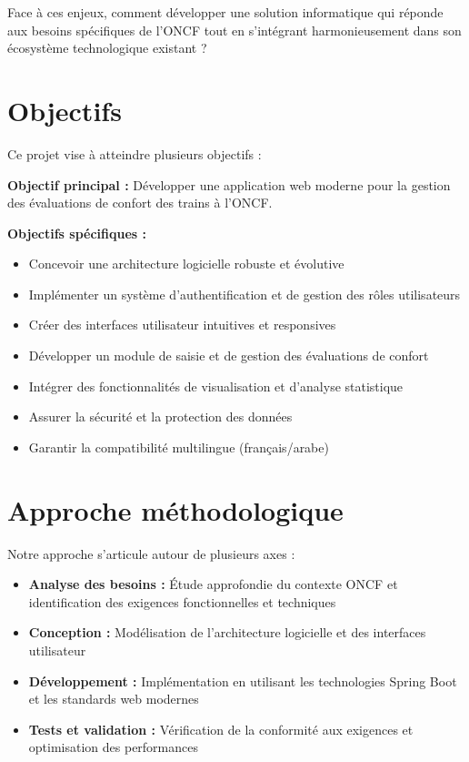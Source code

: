 Face à ces enjeux, comment développer une solution informatique qui réponde aux besoins spécifiques de l'ONCF tout en s'intégrant harmonieusement dans son écosystème technologique existant ?

\section*{Objectifs}

Ce projet vise à atteindre plusieurs objectifs :

\textbf{Objectif principal :} Développer une application web moderne pour la gestion des évaluations de confort des trains à l'ONCF.

\textbf{Objectifs spécifiques :}
\begin{itemize}
    \item Concevoir une architecture logicielle robuste et évolutive
    \item Implémenter un système d'authentification et de gestion des rôles utilisateurs
    \item Créer des interfaces utilisateur intuitives et responsives
    \item Développer un module de saisie et de gestion des évaluations de confort
    \item Intégrer des fonctionnalités de visualisation et d'analyse statistique
    \item Assurer la sécurité et la protection des données
    \item Garantir la compatibilité multilingue (français/arabe)
\end{itemize}

\section*{Approche méthodologique}

Notre approche s'articule autour de plusieurs axes :
\begin{itemize}
    \item \textbf{Analyse des besoins :} Étude approfondie du contexte ONCF et identification des exigences fonctionnelles et techniques
    \item \textbf{Conception :} Modélisation de l'architecture logicielle et des interfaces utilisateur
    \item \textbf{Développement :} Implémentation en utilisant les technologies Spring Boot et les standards web modernes
    \item \textbf{Tests et validation :} Vérification de la conformité aux exigences et optimisation des performances
\end{itemize}

